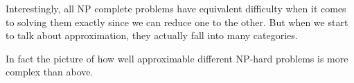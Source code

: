 \documentclass[en,hazy,blue,screen,14pt]{elegantnote}
\begin{document}
Interestingly, all NP complete problems have equivalent difficulty when it comes to solving them exactly since we can reduce one to the other. But when we start to talk about approximation, they actually fall into many categories. 

In fact the picture of how well approximable different NP-hard problems is more complex than above.
\end{document}
